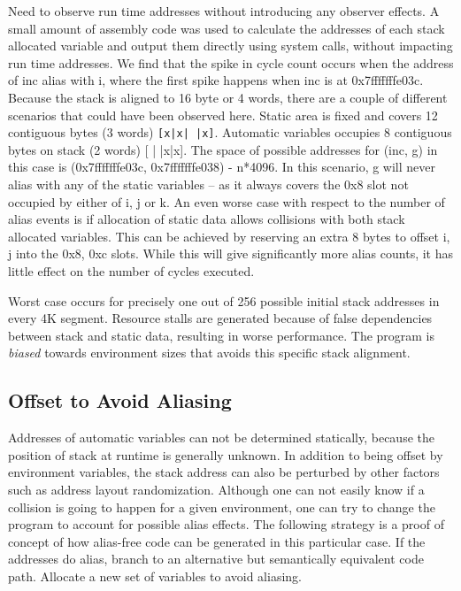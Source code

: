 \documentclass[a4paper,10pt,twocolumn,twoside]{article}
\begin{document}
Need to observe run time addresses without introducing any observer effects.
A small amount of assembly code was used to calculate the addresses of each stack allocated variable and output them directly using system calls, without impacting run time addresses.
We find that the spike in cycle count occurs when the address of inc alias with i, where the first spike happens when inc is at 0x7fffffffe03c.
Because the stack is aligned to 16 byte or 4 words, there are a couple of different scenarios that could have been observed here.
Static area is fixed and covers 12 contiguous bytes (3 words) \lstinline$[x|x| |x]$.
Automatic variables occupies 8 contiguous bytes on stack (2 words) [ | |x|x]. 
The space of possible addresses for (inc, g) in this case is (0x7fffffffe03c, 0x7fffffffe038) - n*4096. 
In this scenario, g will never alias with any of the static variables -- as it always covers the 0x8 slot not occupied by either of i, j or k.
An even worse case with respect to the number of alias events is if allocation of static data allows collisions with both stack allocated variables.
This can be achieved by reserving an extra 8 bytes to offset i, j into the 0x8, 0xc slots. 
While this will give significantly more alias counts, it has little effect on the number of cycles executed.

Worst case occurs for precisely one out of 256 possible initial stack addresses in every 4K segment.
Resource stalls are generated because of false dependencies between stack and static data, resulting in worse performance.
The program is \emph{biased} towards environment sizes that avoids this specific stack alignment.


\subsection{Offset to Avoid Aliasing}
Addresses of automatic variables can not be determined statically, because the position of stack at runtime is generally unknown. 
In addition to being offset by environment variables, the stack address can also be perturbed by other factors such as address layout randomization. 
Although one can not easily know if a collision is going to happen for a given environment, one can try to change the program to account for possible alias effects.
The following strategy is a proof of concept of how alias-free code can be generated in this particular case.
If the addresses do alias, branch to an alternative but semantically equivalent code path.
Allocate a new set of variables to avoid aliasing.
\end{document}
